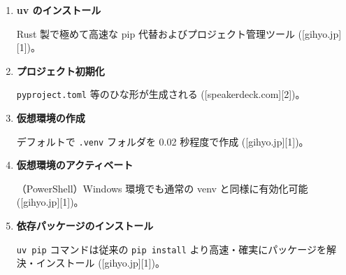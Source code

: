 \begin{enumerate}
\def\labelenumi{\arabic{enumi}.}
\item
  \textbf{uv のインストール}

\begin{Shaded}
\begin{Highlighting}[]
\end{Highlighting}
\end{Shaded}

  Rust 製で極めて高速な pip 代替およびプロジェクト管理ツール ({[}gihyo.jp{]}{[}1{]})。
\item
  \textbf{プロジェクト初期化}

\begin{Shaded}
\begin{Highlighting}[]
\end{Highlighting}
\end{Shaded}

  \texttt{pyproject.toml} 等のひな形が生成される ({[}speakerdeck.com{]}{[}2{]})。
\item
  \textbf{仮想環境の作成}

\begin{Shaded}
\begin{Highlighting}[]
\end{Highlighting}
\end{Shaded}

  デフォルトで \texttt{.venv} フォルダを 0.02 秒程度で作成 ({[}gihyo.jp{]}{[}1{]})。
\item
  \textbf{仮想環境のアクティベート}

\begin{Shaded}
\begin{Highlighting}[]
\NormalTok{\textbackslash{}}
\end{Highlighting}
\end{Shaded}

  （PowerShell）Windows 環境でも通常の venv と同様に有効化可能 ({[}gihyo.jp{]}{[}1{]})。
\item
  \textbf{依存パッケージのインストール}

\begin{Shaded}
\begin{Highlighting}[]
\end{Highlighting}
\end{Shaded}

  \texttt{uv\ pip} コマンドは従来の \texttt{pip\ install} より高速・確実にパッケージを解決・インストール ({[}gihyo.jp{]}{[}1{]})。
\end{enumerate}

